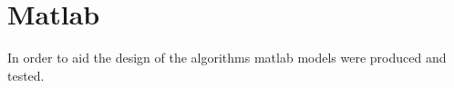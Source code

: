 \section{Matlab}
In order to aid the design of the algorithms matlab models were produced and
tested.

